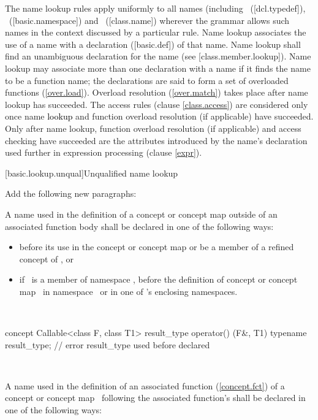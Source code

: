 \documentclass[american]{book}
\newcommand{\editorial}[1]{\colorbox{editbackground}{\begin{minipage}{\linewidth
}#1\end{minipage}}}
\begin{document}
\begin{paras}
\pnum
The name lookup rules apply uniformly to all names (including
\ 
([dcl.typedef]),
\ 
([basic.namespace])\addedConcepts{, \mbox{\techterm{concept-names}}
  (\mbox{\ref{concept}}),} 
and
\techterm{class-names}\ 
([class.name]) wherever the grammar allows such names in the context
discussed by a particular rule.
Name lookup associates the use of a name \textcolor{black}{}with a declaration
([basic.def]) of that name.
Name lookup shall find an unambiguous declaration for the name
(see [class.member.lookup]).
Name lookup may associate more than one declaration with a name if it finds
the name to be a function name;
the declarations are said to form a set of overloaded functions
(\ref{over.load}).
Overload resolution (\ref{over.match}) takes place after name lookup has
succeeded.
The access rules (clause \ref{class.access}) are considered only once
name 
\textcolor{black}{lookup} and
function overload resolution (if applicable) have succeeded.
Only after name lookup, function overload resolution (if applicable) and
access checking have succeeded are the attributes introduced by the name's
declaration used further in expression processing (clause \ref{expr}).

\rSec2[basic.lookup.unqual]{Unqualified name lookup}
\editorial{Add the following new paragraphs:}
\setcounter{Paras}{15}

\color{addclr}
\pnum
A name used in the definition of a concept or concept map  
outside of an associated function body shall be declared in one of the following
ways:

\begin{itemize}
\item %
before its use in the concept or concept map
 or be a member of a refined concept of
, or
\item %
if
\ 
is a member of namespace
,
before the definition of concept or concept map
\tcode{X}\ 
in namespace
\tcode{N}\ 
or in one of
\tcode{N}'s
enclosing namespaces.
\end{itemize}
\enterexample\
\begin{codeblock}
concept Callable<class F, class T1> {
  result_type operator() (F&, T1)
  typename result_type; // error result_type used before declared
}
\end{codeblock}
\exitexample\

\pnum
A name used in the definition of
an associated function
(\ref{concept.fct})
of a concept or concept map
\tcode{X}\ 
following the associated function's
shall be declared in one of the following ways:


\end{paras}
\end{document}
